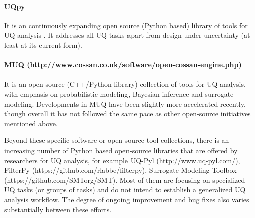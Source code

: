 \paragraph{UQpy} It is an continuously expanding open source (Python based) library of tools for UQ analysis \citep{olivier2020uqpy}. It addresses all UQ tasks apart from design-under-uncertainty (at least at its current form).

\paragraph{MUQ (http://www.cossan.co.uk/software/open-cossan-engine.php)} It is an open source (C++/Python library) collection of tools for UQ analysis, with emphasis on probabilistic modeling, Bayesian inference and surrogate modeling. Developments in MUQ have been slightly more accelerated recently, though overall it has not followed the same pace as other open-source initiatives mentioned above.

Beyond these specific software or open source tool collections, there is an increasing number of Python based open-source libraries that are offered by researchers for UQ analysis, for example UQ-Pyl (http://www.uq-pyl.com/), FilterPy (https://github.com/rlabbe/filterpy), Surrogate Modeling Toolbox (https://github.com/SMTorg/SMT). Most of them are focusing on specialized UQ tasks (or groups of tasks) and do not intend to establish a generalized UQ analysis workflow. The degree of ongoing improvement and bug fixes also varies substantially between these efforts. 

